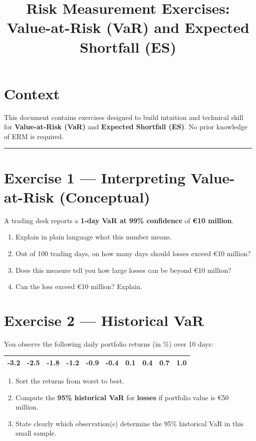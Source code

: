 \documentclass[11pt]{article}
\title{\textbf{Risk Measurement Exercises: Value-at-Risk (VaR) and Expected Shortfall (ES)}}
\author{}
\date{}
\begin{document}
\maketitle

\section*{Context}
This document contains exercises designed to build intuition and technical skill for
\textbf{Value-at-Risk (VaR)} and \textbf{Expected Shortfall (ES)}. No prior knowledge of ERM is required.

\bigskip
\hrule
\bigskip

\section*{Exercise 1 — Interpreting Value-at-Risk (Conceptual)}
A trading desk reports a \textbf{1-day VaR at 99\% confidence} of \textbf{€10 million}.

\begin{enumerate}
  \item Explain in plain language what this number means.
  \item Out of 100 trading days, on how many days should losses exceed €10 million?
  \item Does this measure tell you how large losses can be beyond €10 million?
  \item Can the loss exceed €10 million? Explain.
\end{enumerate}

\section*{Exercise 2 — Historical VaR}
You observe the following daily portfolio returns (in \%) over 10 days:

\begin{center}
\begin{tabular}{cccccccccc}
\toprule
-3.2 & -2.5 & -1.8 & -1.2 & -0.9 & -0.4 & 0.1 & 0.4 & 0.7 & 1.0 \\
\bottomrule
\end{tabular}
\end{center}

\begin{enumerate}
  \item Sort the returns from worst to best.
  \item Compute the \textbf{95\% historical VaR} for \textbf{losses} if portfolio value is €50 million.
  \item State clearly which observation(s) determine the 95\% historical VaR in this small sample.
\end{enumerate}
\end{document}
